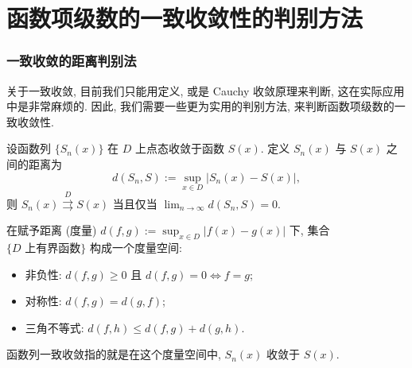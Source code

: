 
\section{函数项级数的一致收敛性的判别方法}


\begin{frame}
\frametitle{一致收敛的距离判别法}

关于一致收敛, 目前我们只能用定义, 或是 Cauchy 收敛原理来判断, 这在实际应用中是非常麻烦的. 因此, 我们需要一些更为实用的判别方法, 来判断函数项级数的一致收敛性.

\pause
\vspace{0.5em}

\begin{thm}
设函数列 $\{S_n(x)\}$ 在 $D$ 上点态收敛于函数 $S(x).$ 定义 $S_n(x)$ 与 $S(x)$ 之间的距离为
\[
d(S_n, S) := \sup_{x \in D} |S_n(x) - S(x)|,
\]
则 $S_n(x) \stackrel{D}{\rightrightarrows} S(x)$ 当且仅当 $\lim_{n \to \infty} d(S_n, S) = 0.$
\end{thm}

\pause

\begin{remark}
在赋予距离 (度量) $d(f, g) := \sup_{x \in D} |f(x) - g(x)|$ 下, 集合 $\{ D \text{ 上有界函数} \}$ 构成一个度量空间:
\begin{itemize}
\item 非负性: $d(f, g) \geq 0$ 且 $d(f, g) = 0 \iff f = g$;
\item 对称性: $d(f, g) = d(g, f)$;
\item 三角不等式: $d(f, h) \leq d(f, g) + d(g, h)$.
\end{itemize}
函数列一致收敛指的就是在这个度量空间中, $S_n(x)$ 收敛于 $S(x).$
\end{remark}

\end{frame}


